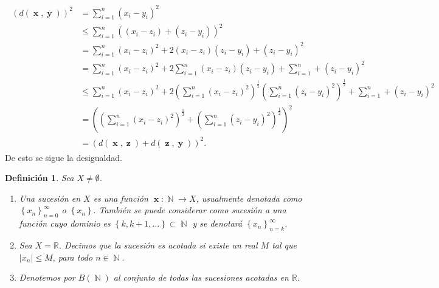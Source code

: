 \documentclass[x11names, 12pt]{book}
\newtheorem{definicion}{Definición}
\DeclareMathOperator{\y}{\textbf{y}}
\DeclareMathOperator{\z}{\textbf{z}}
\DeclareMathOperator{\x}{\textbf{x}}
\DeclareMathOperator{\ene}{\mathbb{N}}
\begin{document}
\begin{eqnarray*}
\begin{split}
    \left(d(\x, \y)\right)^2& =\sum_{i=1}^n(x_i-y_i)^2 \\
    & \leq \sum_{i=1}^n((x_i-z_i)+(z_i-y_i))^2\\
    & =\sum_{i=1}^n(x_i-z_i)^2+2(x_i-z_i)(z_i-y_i)+(z_i-y_i)^2 \\
    & = \sum_{i=1}^n(x_i-z_i)^2 +2\sum_{i=1}^n(x_i-z_i)(z_i-y_i)+\sum_{i=1}^n+(z_i-y_i)^2 \\
    & \leq \sum_{i=1}^n(x_i-z_i)^2 +2\left(\sum_{i=1}^n(x_i-z_i)^2\right)^\frac{1}{2}\left(\sum_{i=1}^n(z_i-y_i)^2\right)^\frac{1}{2}+\sum_{i=1}^n+(z_i-y_i)^2 \\
    & =  \left(\left(\sum_{i=1}^n(x_i-z_i)^2\right)^\frac{1}{2}+\left(\sum_{i=1}^n(z_i-y_i)^2\right)^\frac{1}{2}\right)^2\\
    & =\left(d(\x, \z)+d(\z, \y)\right)^2.
\end{split}
\end{eqnarray*}
De esto se sigue la desigualdad.
\begin{definicion}Sea $X\neq \emptyset$. \begin{enumerate}
    \item Una sucesión en $X$ es una función $\x:\ene \to X$, usualmente denotada como $\left\{ x_n \right\}_{n=0}^\infty $ o  $\left\{ x_n \right\} .$ También se puede considerar como sucesión a una función cuyo dominio es $\left\{ k, k+1, \dots\right\} \subset \ene$  y se denotará  $\left\{ x_n \right\}_{n=k}^\infty $.
    \item Sea $X=\mathbb{R}$. Decimos que la sucesión es acotada si existe un real $M$ tal que $|x_n|\leq M$, para todo $n \in \ene.$
    \item Denotemos por $B(\ene)$ al conjunto de todas las sucesiones acotadas en $\mathbb{R}$.
\end{enumerate}
\end{definicion}
\end{document}
